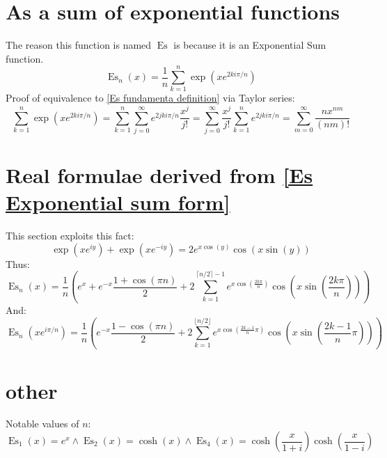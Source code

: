 \documentclass[]{article}
\DeclareMathOperator{\es}{Es}
\newcommand{\pqty}[1]{{\left(#1\right)}}
\begin{document}
	\section{As a sum of exponential functions}
	The reason this function is named $\es$ is because it is an Exponential Sum function.
	\begin{equation}
	\label{Es Exponential sum form}
	\es_n\pqty{x}=
	\frac{1}{n}\sum _{k=1}^n \exp\pqty{xe^{2ki\pi/n}}
	\end{equation}
	Proof of equivalence to \eqref{Es fundamenta definition} via Taylor series:
	\begin{equation}
	\sum _{k=1}^n \exp\pqty{xe^{2ki\pi/n}}
	=
	\sum _{k=1}^n \sum _{j=0}^\infty e^{2jki\pi/n}\frac{x^j}{j!}
	=
	\sum _{j=0}^\infty \frac{x^j}{j!} \sum _{k=1}^n e^{2jki\pi/n}
	=
	\sum_{m=0}^{\infty}\frac{nx^{nm}}{\pqty{nm}!}
	\end{equation}
	
	
	\section{Real formulae derived from \eqref{Es Exponential sum form}}
	This section exploits this fact:
	\begin{equation}
	\exp\pqty{xe^{iy}}+\exp\pqty{xe^{-iy}}
	=
	2e^{x\cos\pqty{y}} \cos\pqty{x\sin\pqty{y}}
	\end{equation}
	Thus:
	\begin{equation}
	\label{Es trig sum form 1}
	\es_n\pqty{x}
	=
	\frac{1}{n}\pqty{
		e^x+e^{-x}\frac{1+\cos\pqty{\pi n}}{2} 
		+2\sum _{k=1}^{\lceil n/2\rceil-1}e^{x\cos\pqty{\frac{2k\pi}{n}}} \cos\pqty{x\sin\pqty{\frac{2k\pi}{n}}}
	}
	\end{equation}
	And:
	\begin{equation}
	\es_n\pqty{xe^{i\pi/n}}
	=
	\frac{1}{n}\pqty{
		e^{-x}\frac{1-\cos\pqty{\pi n}}{2}
		+2\sum _{k=1}^{\lfloor n/2\rfloor}e^{x\cos\pqty{\frac{2k-1}{n}\pi}} \cos\pqty{x\sin\pqty{\frac{2k-1}{n}\pi}}
	}
	\end{equation}
	
	
	
	\section{other}
	Notable values of \(n\):
	\begin{equation}
	\es_1\pqty{x}=e^x\land\es_2\pqty{x}=\cosh\pqty{x}\land\es_4\pqty{x}=\cosh\pqty{\frac{x}{1+i}}\cosh\pqty{\frac{x}{1-i}}
	\end{equation}
	
\end{document}
